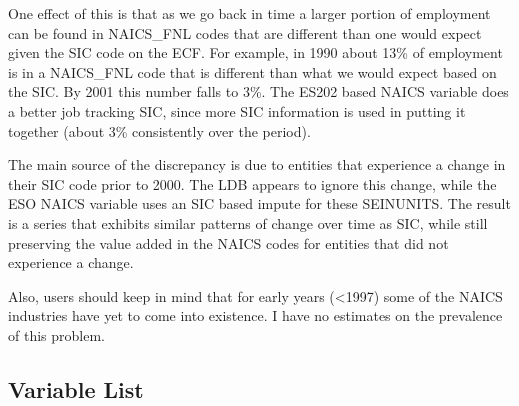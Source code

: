 One effect of this is that as we go back in time a larger portion of 
employment can be found in NAICS{\_}FNL codes that are different than one 
would expect given the SIC code on the ECF. For example, in 1990 about 
13{\%} of employment is in a NAICS{\_}FNL code that is different than what 
we would expect based on the SIC. By 2001 this number falls to 3{\%}. The 
ES202 based NAICS variable does a better job tracking SIC, since more SIC 
information is used in putting it together (about 3{\%} consistently over 
the period).

The main source of the discrepancy is due to entities that experience a 
change in their SIC code prior to 2000. The LDB appears to ignore this 
change, while the ESO NAICS variable uses an SIC based impute for these 
SEINUNITS. The result is a series that exhibits similar patterns of change 
over time as SIC, while still preserving the value added in the NAICS codes 
for entities that did not experience a change.

Also, users should keep in mind that for early years (<1997) some of the 
NAICS industries have yet to come into existence. I have no estimates on the 
prevalence of this problem.

\subsection{Variable List}




